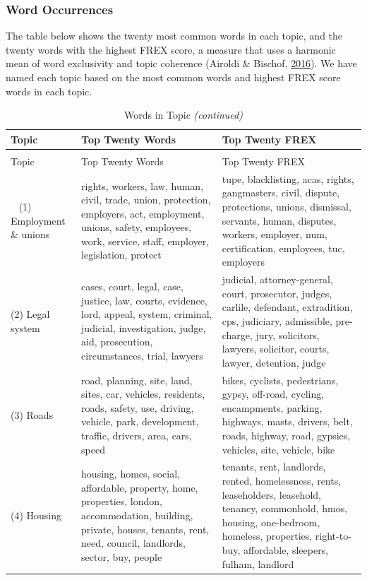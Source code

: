 \documentclass[]{article}
\theoremstyle{definition}
\theoremstyle{definition}
\theoremstyle{definition}
\theoremstyle{remark}
\begin{document}
\hypertarget{word-occurrences}{%
\subsubsection{Word Occurrences}\label{word-occurrences}}

The table below shows the twenty most common words in each topic, and
the twenty words with the highest FREX score, a measure that uses a
harmonic mean of word exclusivity and topic coherence (Airoldi \&
Bischof, \protect\hyperlink{ref-airoldi2016}{2016}). We have named each
topic based on the most common words and highest FREX score words in
each topic.

\begin{longtabu} to 
\caption{\label{tab:topic-words-table-k0}Words in Topic}\\
\toprule
Topic & Top Twenty Words & Top Twenty FREX\\
\midrule
\endfirsthead
\caption[]{\label{tab:topic-words-table-k0}Words in Topic \textit{(continued)}}\\
\toprule
Topic & Top Twenty Words & Top Twenty FREX\\
\midrule
\endhead
\
\endfoot
\bottomrule
\endlastfoot
(1) Employment \& unions & rights, workers, law, human, civil, trade, union, protection, employers, act, employment, unions, safety, employees, work, service, staff, employer, legislation, protect & tupe, blacklisting, acas, rights, gangmasters, civil, dispute, protections, unions, dismissal, servants, human, disputes, workers, employer, num, certification, employees, tuc, employers\\
(2) Legal system & cases, court, legal, case, justice, law, courts, evidence, lord, appeal, system, criminal, judicial, investigation, judge, aid, prosecution, circumstances, trial, lawyers & judicial, attorney-general, court, prosecutor, judges, carlile, defendant, extradition, cps, judiciary, admissible, pre-charge, jury, solicitors, lawyers, solicitor, courts, lawyer, detention, judge\\
(3) Roads & road, planning, site, land, sites, car, vehicles, residents, roads, safety, use, driving, vehicle, park, development, traffic, drivers, area, cars, speed & bikes, cyclists, pedestrians, gypsy, off-road, cycling, encampments, parking, highways, masts, drivers, belt, roads, highway, road, gypsies, vehicles, site, vehicle, bike\\
(4) Housing & housing, homes, social, affordable, property, home, properties, london, accommodation, building, private, houses, tenants, rent, need, council, landlords, sector, buy, people & tenants, rent, landlords, rented, homelessness, rents, leaseholders, leasehold, tenancy, commonhold, hmos, housing, one-bedroom, homeless, properties, right-to-buy, affordable, sleepers, fulham, landlord\\

\end{longtabu}
\end{document}
